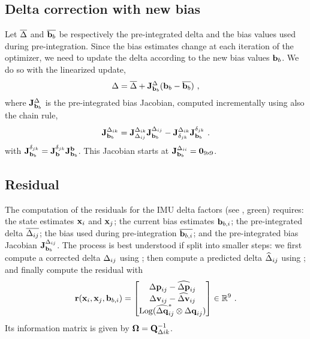 \subsection{Delta correction with new bias}

Let $\overline{\Delta}$ and $\overline{{\bf b}_b}$ be respectively the pre-integrated delta and the bias values used during pre-integration. Since the bias estimates change at each iteration of the optimizer, we need to update the delta according to the new bias values ${\bf b}_b$. We do so with the linearized update,
%
\begin{align}\label{equ:delta_correction}
\Delta = \overline{\Delta} + {{\bf J}^{\Delta}_{{\bf b}_b}}({\bf b}_b - \overline{{\bf b}_b})
~,
\end{align}
%
where ${{\bf J}^{\Delta}_{{\bf b}_b}}$ is the pre-integrated bias Jacobian, computed incrementally using also the chain rule,
%
\begin{align}
{{\bf J}^{\Delta_{ik}}_{{\bf b}_b}} 
= {{\bf J}^{\Delta_{ik}}_{\Delta_{ij}}}{{\bf J}^{\Delta_{ij}}_{{\bf b}_b}} 
- {{\bf J}^{\Delta_{ik}}_{\delta_{jk}}}{{\bf J}^{\delta_{jk}}_{{\bf b}_b}}
~.
\end{align}
%
with 
$
{{\bf J}^{\delta_{jk}}_{{\bf b}_b}}={{\bf J}^{\delta_{jk}}_{{\bf b}}} {{\bf J}^{{\bf b}}_{{\bf b}_b}}
$.
%
This Jacobian starts at ${{\bf J}^{\Delta_{ii}}_{{\bf b}_b}} = {\bf0}_{9\!\times\! 9}$.


\subsection{Residual}

The computation of the residuals for the IMU delta factors (see , green) requires: the state estimates ${\bf x}_i$ and ${\bf x}_j$; the current bias estimates ${\bf b}_{b,i}$; the pre-integrated delta $\overline{\Delta_{ij}}$; the bias used during pre-integration $\overline{{\bf b}_{b,i}}$; and the pre-integrated bias Jacobian ${{\bf J}^{\Delta_{ij}}_{{\bf b}_b}}$. The process is best understood if split into smaller steps: we first compute a corrected delta $\Delta_{ij}$ using ; then compute a predicted delta $\widehat{\Delta}_{ij}$ using ; and finally compute the residual with
%
\begin{align}\label{equ:imu_residual}
{\bf r}({\bf x}_i,{\bf x}_j,{\bf b}_{b,i}) 
= \begin{bmatrix}
{\Delta{\bf p}}_{ij}-\widehat{{\Delta{\bf p}}}_{ij} \\
{\Delta{\bf v}}_{ij}-\widehat{{\Delta{\bf v}}}_{ij} \\
\operatorname*{Log}(\widehat{{\Delta{\bf q}}}_{ij}^*\otimes{\Delta{\bf q}}_{ij})
\end{bmatrix} 
\in {\mathbb R}^9
~.
\end{align}
%
Its information matrix is given by ${\bm \Omega}={\bf Q}_{\Delta ik}^{-1}$.






